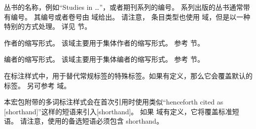 \begin{fieldlist}

丛书的名称，例如“Studies in \dots”，或者期刊系列的编号。
系列出版的丛书通常带有编号。
其编号或者卷号由  域给出。
请注意， 条目类型也使用  域，但是以一种特别的方式处理。
详见  节。




作者的缩写形式。
该域主要用于集体作者的缩写形式。
参考  节。




编者的缩写形式。
该域主要用于集体编者的缩写形式。
参考  节。




在标注样式中，用于替代常规标签的特殊标签。如果有定义，那么它会覆盖默认的标签。
另可参考  域。




本宏包附带的多词标注样式会在首次引用时使用类似“henceforth cited as [shorthand]”这样的短语来引入[shorthand]。
如果  域有定义，它将覆盖标准短语。
请注意，使用的备选短语必须包含 shorthand。



\end{fieldlist}
